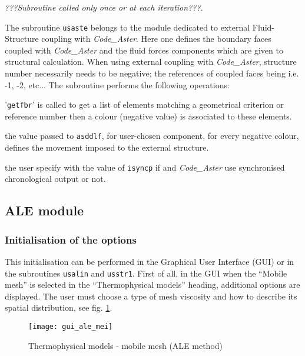 {{{\noindent
\textit{???Subroutine called only once or at each iteration???.}

The subroutine \texttt{usaste} belongs to the module dedicated to external
 Fluid-Structure coupling with \textit{Code\_Aster}. Here one defines the boundary
 faces coupled with \textit{Code\_Aster} and the fluid forces components which are
 given to structural calculation. When using external coupling with \textit{Code\_Aster},
 structure number necessarily needs to be negative; the references of coupled faces being
 i.e. -1, -2, etc...
The subroutine performs the following operations:
\begin{list}{-}{}
 \item '\texttt{getfbr}' is called to get a list of elements matching a 
geometrical criterion or reference number then a colour (negative value) is associated
 to these elements.
 \item the value passed to \texttt{asddlf}, for user-chosen component, for every negative
 colour, defines the movement imposed to the external structure.
 \item the user specify with the value of \texttt{isyncp} if \CS and \textit{Code\_Aster}
 use synchronised chronological output or not.
\end{list}

\subsection{ALE module}
\subsubsection{Initialisation of the options}
\label{prg_usalin}%
This initialisation can be performed in the Graphical User Interface (GUI)
 or in the subroutines \texttt{usalin} and \texttt{usstr1}. First of all,
 in the GUI when the ``Mobile mesh'' is selected in the ``Thermophysical models''
 heading, additional options are displayed. The user must choose a type of mesh
 viscosity and how to describe its spatial distribution, see fig. \ref{fig:Ini-ale}.

\begin{figure}[ht]
\begin{center}
\texttt{[image: gui\_ale\_mei]}
\caption{Thermophysical models - mobile mesh (ALE method)}
\label{fig:Ini-ale}
\end{center}
\end{figure}

}}}
